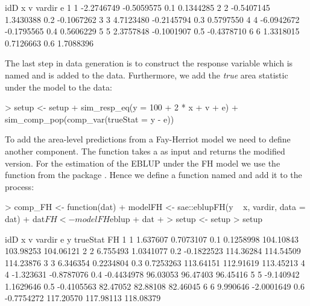 \documentclass[article]{ajs}
\begin{document}
\begin{Schunk}
\begin{Soutput}
  idD          x          v vardir          e
1   1 -2.2746749 -0.5059575    0.1  0.1344285
2   2 -0.5407145  1.3430388    0.2 -0.1067262
3   3  4.7123480 -0.2145794    0.3  0.5797550
4   4 -6.0942672 -0.1795565    0.4  0.5606229
5   5  2.3757848 -0.1001907    0.5 -0.4378710
6   6  1.3318015  0.7126663    0.6  1.7088396
\end{Soutput}
\end{Schunk}

The last step in data generation is to construct the response variable which is named  and is added to the data. Furthermore, we add the \textit{true} area statistic under the model to the data:

\begin{Schunk}
\begin{Sinput}
> setup <- setup %
+   sim_resp_eq(y = 100 + 2 * x + v + e) %
+   sim_comp_pop(comp_var(trueStat = y - e))
\end{Sinput}
\end{Schunk}

To add the area-level predictions from a Fay-Herriot model we need to define another component. The function takes a  as input and returns the modified version. For the estimation of the EBLUP under the FH model we use the function  from the package  \citep{molina13}. Hence we define a function named  and add it to the process:

\begin{Schunk}
\begin{Sinput}
> comp_FH <- function(dat) {
+   modelFH <- sae::eblupFH(y ~ x, vardir, data = dat)
+   dat$FH <- modelFH$eblup
+   dat
+ }
> setup <- setup %
> setup
\end{Sinput}
\begin{Soutput}
  idD         x          v vardir          e         y  trueStat        FH
1   1  1.637607  0.7073107    0.1  0.1258998 104.10843 103.98253 104.06121
2   2  6.755493  1.0341077    0.2 -0.1822523 114.36284 114.54509 114.23876
3   3  6.346354  0.2234804    0.3  0.7253263 113.64151 112.91619 113.45213
4   4 -1.323631 -0.8787076    0.4 -0.4434978  96.03053  96.47403  96.45416
5   5 -9.140942  1.1629646    0.5 -0.4105563  82.47052  82.88108  82.46045
6   6  9.990646 -2.0001649    0.6 -0.7754272 117.20570 117.98113 118.08379
\end{Soutput}
\end{Schunk}
\end{document}
